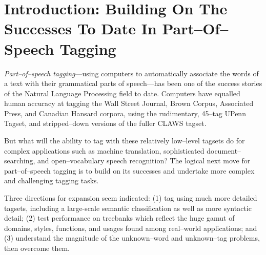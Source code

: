 


\maketitle

\section{Introduction: Building On The Successes To Date In Part--Of--Speech Tagging}

{\em Part--of--speech tagging}---using computers to automatically
associate the words of a text with\hspace{-0.2mm} their\hspace{-0.2mm}
grammatical\hspace{-0.2mm} parts\hspace{-0.2mm} of\hspace{-0.2mm}
speech---has\hspace{-0.2mm} been\hspace{-0.2mm} one\hspace{-0.2mm}
of\hspace{-0.2mm} the\hspace{-0.2mm} success\hspace{-0.2mm}
stories\hspace{-0.2mm} of\hspace{-0.2mm} the\hspace{-0.2mm}
Natural\hspace{-0.2mm} Language
Processing field to date. Computers have equalled human accuracy at
tagging the Wall Street Journal, Brown Corpus, Associated Press, and
Canadian Hansard
corpora\cite{Brill:advances,Weischedel+al:class,Merialdo:tagging,Black+al:tag,Marcus+al:class,Kucera+Francis:KF,Garside+McEnery:GM},
using the rudimentary, 45--tag UPenn
Tagset\cite{Marcus+al:class}, and stripped--down versions
of the fuller CLAWS
tagset\cite{Eyes+Leech:EL,Garside+al:comp,Garside+McEnery:GM}.

But what will the ability to tag with these relatively low--level
tagsets do for complex applications such as machine translation,
sophisticated document--searching, and open--vocabulary speech
recognition? The logical next move for part--of--speech tagging is to
build on its successes and undertake more complex and challenging
tagging tasks.

Three directions for expansion seem indicated: (1) tag using much
more detailed tagsets, including a large-scale semantic classification
as well as more syntactic detail; (2) test performance on treebanks
which reflect the huge gamut of domains, styles, functions, and usages
found among real--world applications; and (3) understand the
magnitude of the unknown--word and unknown--tag problems, then overcome
them.

